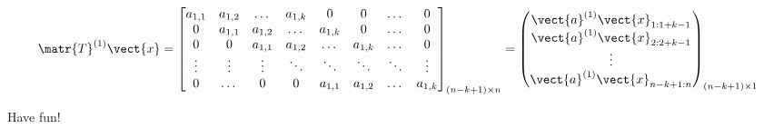 \[
\matr{T}^{(1)}\vect{x} =
\begin{bmatrix}
    a_{1,1} & a_{1,2} & \dotsc & a_{1,k} & 0 & 0 & \dotsc & 0 \\
    0 & a_{1,1} & a_{1,2} & \dotsc & a_{1,k} & 0 & \dotsc & 0 \\
    0 & 0 & a_{1,1} & a_{1,2} & \dotsc & a_{1,k} & \dotsc & 0 \\
    \vdots & \vdots & \vdots & \ddots & \ddots & \ddots & \ddots & \vdots \\
    0 & \dotsc & 0 & 0 & a_{1,1} & a_{1,2} & \dotsc & a_{1,k}
\end{bmatrix}_{(n-k+1) \times n} =
\begin{pmatrix}
    \vect{a}^{(1)} \vect{x}_{1:1+k-1} \\ \vect{a}^{(1)} \vect{x}_{2:2+k-1} \\ \vdots \\ \vect{a}^{(1)}  \vect{x}_{n-k+1:n}
\end{pmatrix}_{(n-k+1) \times 1}
\]

Have fun!
